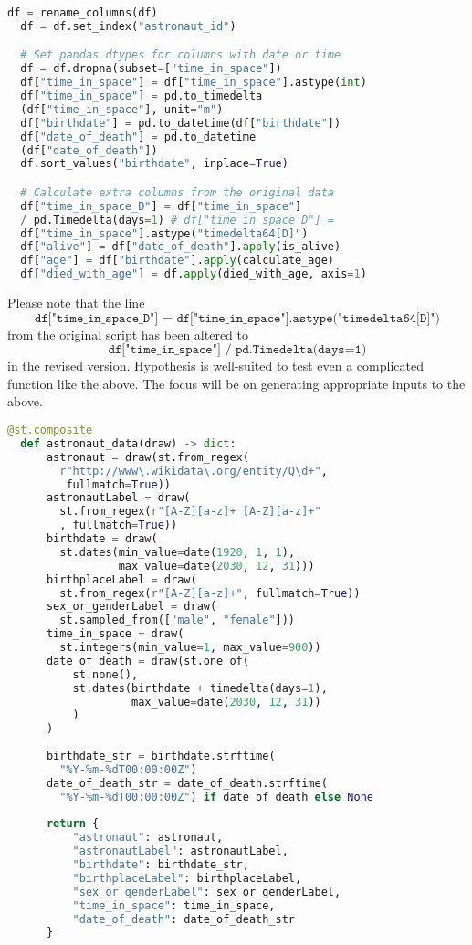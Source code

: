 \documentclass[runningheads]{llncs}
\begin{document}
\begin{lstlisting}[language=Python]
  df = rename_columns(df)
  df = df.set_index("astronaut_id")

  # Set pandas dtypes for columns with date or time
  df = df.dropna(subset=["time_in_space"])
  df["time_in_space"] = df["time_in_space"].astype(int)
  df["time_in_space"] = pd.to_timedelta
  (df["time_in_space"], unit="m")
  df["birthdate"] = pd.to_datetime(df["birthdate"])
  df["date_of_death"] = pd.to_datetime
  (df["date_of_death"])
  df.sort_values("birthdate", inplace=True)

  # Calculate extra columns from the original data
  df["time_in_space_D"] = df["time_in_space"] 
  / pd.Timedelta(days=1) # df["time_in_space_D"] = 
  df["time_in_space"].astype("timedelta64[D]")
  df["alive"] = df["date_of_death"].apply(is_alive)
  df["age"] = df["birthdate"].apply(calculate_age)
  df["died_with_age"] = df.apply(died_with_age, axis=1)
\end{lstlisting}

Please note that the line
\begin{equation}
  \texttt{df["time\_in\_space\_D"] = df["time\_in\_space"].astype("timedelta64[D]")}
\end{equation}
from the original script has been altered to
\begin{equation}
  \texttt{df["time\_in\_space"] / pd.Timedelta(days=1)}
\end{equation}
in the revised version.
Hypothesis is well-suited to test even a complicated function like the above. The focus
will be on generating appropriate inputs to the above.

\begin{lstlisting}[language=Python]
  @st.composite
  def astronaut_data(draw) -> dict:
      astronaut = draw(st.from_regex(
        r"http://www\.wikidata\.org/entity/Q\d+",
         fullmatch=True))
      astronautLabel = draw(
        st.from_regex(r"[A-Z][a-z]+ [A-Z][a-z]+"
        , fullmatch=True))
      birthdate = draw(
        st.dates(min_value=date(1920, 1, 1), 
                 max_value=date(2030, 12, 31)))
      birthplaceLabel = draw(
        st.from_regex(r"[A-Z][a-z]+", fullmatch=True))
      sex_or_genderLabel = draw(
        st.sampled_from(["male", "female"]))
      time_in_space = draw(
        st.integers(min_value=1, max_value=900)) 
      date_of_death = draw(st.one_of(
          st.none(), 
          st.dates(birthdate + timedelta(days=1), 
                   max_value=date(2030, 12, 31))
          )
      )
  
      birthdate_str = birthdate.strftime(
        "%Y-%m-%dT00:00:00Z")
      date_of_death_str = date_of_death.strftime(
        "%Y-%m-%dT00:00:00Z") if date_of_death else None
  
      return {
          "astronaut": astronaut,
          "astronautLabel": astronautLabel,
          "birthdate": birthdate_str,
          "birthplaceLabel": birthplaceLabel,
          "sex_or_genderLabel": sex_or_genderLabel,
          "time_in_space": time_in_space,
          "date_of_death": date_of_death_str
      }
\end{lstlisting}
\end{document}
